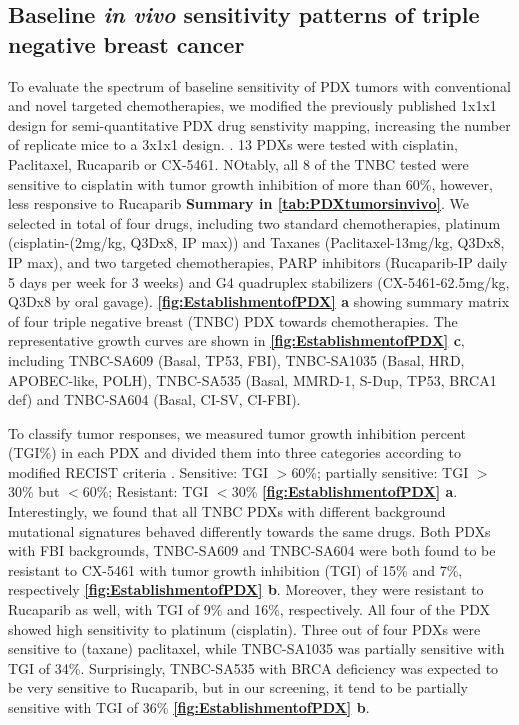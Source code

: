 \subsection{Baseline \textit{in vivo} sensitivity patterns of triple negative breast cancer}
To evaluate the spectrum of baseline sensitivity of PDX tumors with conventional and novel targeted chemotherapies, we modified the previously published 1x1x1 design for semi-quantitative PDX drug senstivity mapping, increasing the number of replicate mice to a 3x1x1 design. \cite{gao2015high,migliardi2012inhibition}. 
 13 PDXs were tested with cisplatin, Paclitaxel, Rucaparib or CX-5461. NOtably, all 8 of the TNBC tested were sensitive to cisplatin with tumor growth inhibition of more than 60\%, however, less responsive to Rucaparib \textbf{Summary in \autoref{tab:PDXtumorsinvivo}}. 
We selected in total of four drugs, including two standard chemotherapies, platinum (cisplatin-(2mg/kg, \ac{Q3Dx8}, \ac{IP} max)) and Taxanes (Paclitaxel-13mg/kg, \ac{Q3Dx8}, \ac{IP} max), and two targeted chemotherapies, PARP inhibitors (Rucaparib-\ac{IP} daily 5 days per week for 3 weeks) and G4 quadruplex stabilizers (CX-5461-62.5mg/kg, \ac{Q3Dx8} by oral gavage). 
\textbf{\autoref{fig:EstablishmentofPDX} a} showing summary matrix of four triple negative breast (TNBC) PDX towards chemotherapies. 
The representative growth curves are shown in \textbf{\autoref{fig:EstablishmentofPDX} c}, including TNBC-SA609 (Basal, TP53, FBI), TNBC-SA1035 (Basal, HRD, APOBEC-like, POLH), TNBC-SA535 (Basal, MMRD-1, S-Dup, TP53, BRCA1 def) and TNBC-SA604 (Basal, CI-SV, CI-FBI).

To classify tumor responses, we measured tumor growth inhibition percent (TGI\%) in each PDX and divided them into three categories according to modified RECIST criteria \cite{aykan2020objective}. Sensitive: \ac{TGI} $>$60\%; partially sensitive: \ac{TGI} $>$30\% but $<$60\%; Resistant: \ac{TGI} $<$30\% \textbf{\autoref{fig:EstablishmentofPDX} a}.
Interestingly, we found that all TNBC PDXs with different background mutational signatures behaved differently towards the same drugs. Both PDXs with FBI backgrounds, TNBC-SA609 and TNBC-SA604 were both found to be resistant to CX-5461 with tumor growth inhibition (TGI) of 15\% and 7\%, respectively \textbf{\autoref{fig:EstablishmentofPDX} b}. Moreover, they were resistant to Rucaparib as well, with \ac{TGI} of 9\% and 16\%, respectively.
All four of the PDX showed high sensitivity to platinum (cisplatin). Three out of four PDXs were sensitive to (taxane) paclitaxel, while TNBC-SA1035 was partially sensitive with \ac{TGI} of 34\%. Surprisingly,  TNBC-SA535 with BRCA deficiency was expected to be very sensitive to Rucaparib, but in our screening, it tend to be partially sensitive with \ac{TGI} of 36\% \textbf{\autoref{fig:EstablishmentofPDX} b}.


